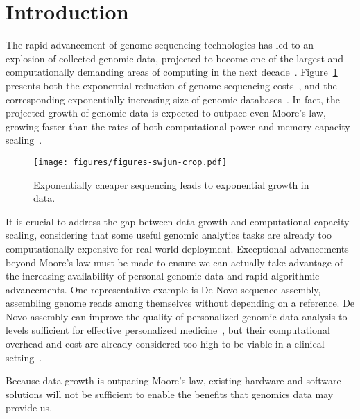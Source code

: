 \section{Introduction}
\label{sec:introduction}

The rapid advancement of genome sequencing technologies has led to an explosion of collected genomic data, projected to become one of the largest and computationally demanding areas of computing in the next decade~\cite{stephens2015bigdatagenomics}.
Figure~\ref{fig:growth} presents both the exponential reduction of genome sequencing costs~\cite{dna_sequencing_cost}, and the corresponding exponentially increasing size of genomic databases~\cite{genbank_bases}.
In fact, the projected growth of genomic data is expected to outpace even Moore's law, growing faster than the rates of both computational power and memory capacity scaling~\cite{chen2020parc,kaplan2020bioseal,turakhia2018darwin}.

\begin{figure}[htb]
    \centering
    \texttt{[image: figures/figures-swjun-crop.pdf]}
    \caption{Exponentially cheaper sequencing leads to exponential growth in data.}
    \label{fig:growth}
\end{figure}

It is crucial to address the gap between data growth and computational capacity scaling, considering that some useful genomic analytics tasks are already too computationally expensive for real-world deployment.
Exceptional advancements beyond Moore's law must be made to ensure we can actually take advantage of the increasing availability of personal genomic data and rapid algorithmic advancements.
One representative example is De Novo sequence assembly, assembling genome reads among themselves without depending on a reference.
De Novo assembly can improve the quality of personalized genomic data analysis to levels sufficient for effective personalized medicine~\cite{ashley2016towardsprecisionmedicine,chaisson2015geneticdenovo}, but their computational overhead and cost are already considered too high to be viable in a clinical setting~\cite{ashley2016towardsprecisionmedicine}.

Because data growth is outpacing Moore's law, existing hardware and software solutions will not be sufficient to enable the benefits that genomics data may provide us.

